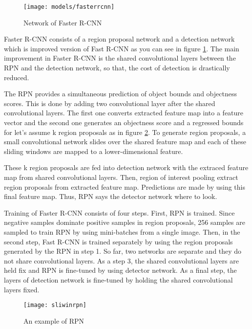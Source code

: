 \documentclass{article}
\begin{document}
\setlength{\parindent}{6ex}

\begin{figure}
    \centering
    \texttt{[image: models/fasterrcnn]}
    \caption{Network of Faster R-CNN}
    \label{fig:fasterrcnn1}
\end{figure}

\indent

Faster R-CNN \cite{fasterrcnncite} consists of a region proposal network and a detection network which 
is improved version of Fast R-CNN as you can see in figure \ref{fig:fasterrcnn1}. 
The main improvement in Faster R-CNN is the shared convolutional layers between 
the RPN and the detection network, so that, the cost of detection is drastically 
reduced. \par

The RPN provides a simultaneous prediction of object bounds and 
objectness scores. This is done by adding two convolutional layer after the 
shared convolutional layers. The first one converts extracted feature map into a 
feature vector and the second one generates an objectness score and a regressed 
bounds for let's assume k region proposals as in figure \ref{fig:sliwinrpn1}. To 
generate region proposals, a small convolutional network slides over the shared 
feature map and each of these sliding windows are mapped to a lower-dimensional 
feature. \par

These k region proposals are fed into detection network with the extraced feature 
map from shared convolutional layers. Then, region of interest pooling extract 
region proposals from extracted feature map. Predictions are made by using this 
final feature map. Thus, RPN says the detector network where to look. \par

Training of Faster R-CNN consists of four steps. First, RPN is trained. Since 
negative samples dominate positive samples in region proposals, 256 samples are 
sampled to train RPN by using mini-batches from a single image. Then, in the 
second step, Fast R-CNN is trained separately by using the region proposals 
generated by the RPN in step 1. So far, two networks are separate and they do 
not share convolutional layers. As a step 3, the shared convolutional layers are 
held fix and RPN is fine-tuned by using detector network. As a final step, the 
layers of detection network is fine-tuned by holding the shared convolutional layers 
fixed.
\begin{figure}
    \centering
    \texttt{[image: sliwinrpn]}
    \caption{An example of RPN}
    \label{fig:sliwinrpn1}
\end{figure}
\end{document}
